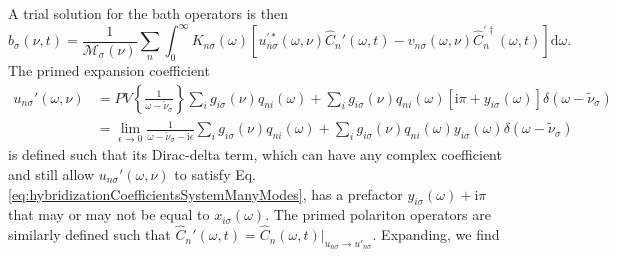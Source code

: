 A trial solution for the bath operators is then
\begin{equation}
\hat{b}_\sigma(\nu,t) = \frac{1}{\mathcal{M}_\sigma(\nu)}\sum_n\int_0^\infty K_{n\sigma}(\omega)\left[u_{n\sigma}^{\prime*}(\omega,\nu)\hat{C}_n'(\omega,t) - v_{n\sigma}(\omega,\nu)\hat{C}_n^{\prime\dagger}(\omega,t)\right]\mathrm{d}\omega.
\end{equation}
The primed expansion coefficient
\begin{equation}
\begin{split}
u_{n\sigma}'(\omega,\nu) &= PV\left\{\frac{1}{\omega - \tilde{\nu}_\sigma}\right\}\sum_ig_{i\sigma}(\nu)q_{ni}(\omega) + \sum_ig_{i\sigma}(\nu)q_{ni}(\omega)[\mathrm{i}\pi + y_{i\sigma}(\omega)]\delta(\omega - \tilde{\nu}_\sigma)\\
&= \lim_{\epsilon\to0}\frac{1}{\omega - \tilde{\nu}_\sigma - \mathrm{i}\epsilon}\sum_ig_{i\sigma}(\nu)q_{ni}(\omega) + \sum_ig_{i\sigma}(\nu)q_{ni}(\omega)y_{i\sigma}(\omega)\delta(\omega - \tilde{\nu}_\sigma)
\end{split}
\end{equation}
is defined such that its Dirac-delta term, which can have any complex coefficient and still allow $u_{n\sigma}'(\omega,\nu)$ to satisfy Eq. \eqref{eq:hybridizationCoefficientsSystemManyModes}, has a prefactor $y_{i\sigma}(\omega) + \mathrm{i}\pi$ that may or may not be equal to $x_{i\sigma}(\omega)$. The primed polariton operators are similarly defined such that $\hat{C}_n'(\omega,t) = \hat{C}_n(\omega,t)|_{u_{n\sigma}\to u'_{n\sigma}}$. Expanding, we find
